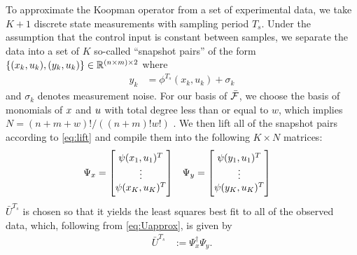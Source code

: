 

To approximate the Koopman operator from a set of experimental data, we take $K+1$ discrete state measurements with sampling period $T_s$. Under the assumption that the control input is constant between samples, we separate the data into a set of $K$ so-called ``snapshot pairs'' of the form ${ \{(x_k,u_k),(y_{k},u_k)\} \in \mathbb{R}^{(n \times m) \times 2} }$ where
\begin{align}
    y_{k} &= \phi^{T_s} (x_k, u_k) + \sigma_k
\end{align}
and $\sigma_k$ denotes measurement noise.
For our basis of $\bar{\mathcal{F}}$, we choose the basis of monomials of $x$ and $u$ with total degree less than or equal to $w$, which implies ${N=(n+m+w)!/\left((n+m)!w!\right)}$ \cite[Section III]{mauroy2016linear}. 
We then lift all of the snapshot pairs according to \eqref{eq:lift} and compile them into the following $K \times N$ matrices:
\begin{align}
    &\Psi_x = \begin{bmatrix}  {\psi}(x_1, u_1)^T \\ \vdots \\  {\psi}(x_K, u_K)^T \end{bmatrix}
    &&\Psi_y = \begin{bmatrix}  {\psi}(y_1, u_1)^T \\ \vdots \\  {\psi}(y_K, u_{K})^T \end{bmatrix}
\end{align}
 $\bar{U}^{T_s}$ is chosen so that it yields the least squares best fit to all of the observed data, which, following from \eqref{eq:Uapprox}, is given by 
\begin{align}
    \bar{U}^{T_s} &:= \Psi_x^\dagger \Psi_y.
\end{align}


